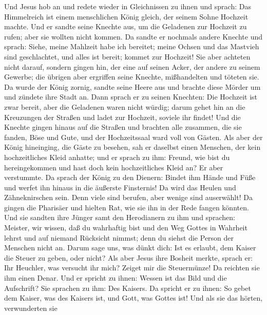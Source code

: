  Und Jesus hob an und redete wieder in Gleichnissen zu
ihnen und sprach:  Das Himmelreich ist einem menschlichen
König gleich, der seinem Sohne Hochzeit machte.  Und er
sandte seine Knechte aus, um die Geladenen zur Hochzeit zu rufen; aber
sie wollten nicht kommen.  Da sandte er nochmals andere
Knechte und sprach: Siehe, meine Mahlzeit habe ich bereitet; meine
Ochsen und das Mastvieh sind geschlachtet, und alles ist bereit; kommet
zur Hochzeit!  Sie aber achteten nicht darauf, sondern
gingen hin, der eine auf seinen Acker, der andere zu seinem Gewerbe;
 die übrigen aber ergriffen seine Knechte, mißhandelten
und töteten sie.  Da wurde der König zornig, sandte seine
Heere aus und brachte diese Mörder um und zündete ihre Stadt an.
 Dann sprach er zu seinen Knechten: Die Hochzeit ist zwar
bereit, aber die Geladenen waren nicht würdig;  darum
gehet hin an die Kreuzungen der Straßen und ladet zur Hochzeit, soviele
ihr findet!  Und die Knechte gingen hinaus auf die
Straßen und brachten alle zusammen, die sie fanden, Böse und Gute, und
der Hochzeitssaal ward voll von Gästen.  Als aber der
König hineinging, die Gäste zu besehen, sah er daselbst einen Menschen,
der kein hochzeitliches Kleid anhatte;  und er sprach zu
ihm: Freund, wie bist du hereingekommen und hast doch kein
hochzeitliches Kleid an? Er aber verstummte.  Da sprach
der König zu den Dienern: Bindet ihm Hände und Füße und werfet ihn
hinaus in die äußerste Finsternis! Da wird das Heulen und Zähneknirschen
sein.  Denn viele sind berufen, aber wenige sind
auserwählt!  Da gingen die Pharisäer und hielten Rat, wie
sie ihn in der Rede fangen könnten.  Und sie sandten ihre
Jünger samt den Herodianern zu ihm und sprachen: Meister, wir wissen,
daß du wahrhaftig bist und den Weg Gottes in Wahrheit lehrst und auf
niemand Rücksicht nimmst; denn du siehst die Person der Menschen nicht
an.  Darum sage uns, was dünkt dich: Ist es erlaubt, dem
Kaiser die Steuer zu geben, oder nicht?  Als aber Jesus
ihre Bosheit merkte, sprach er: Ihr Heuchler, was versucht ihr mich?
 Zeiget mir die Steuermünze! Da reichten sie ihm einen
Denar.  Und er spricht zu ihnen: Wessen ist das Bild und
die Aufschrift?  Sie sprachen zu ihm: Des Kaisers. Da
spricht er zu ihnen: So gebet dem Kaiser, was des Kaisers ist, und Gott,
was Gottes ist!  Und als sie das hörten, verwunderten sie

